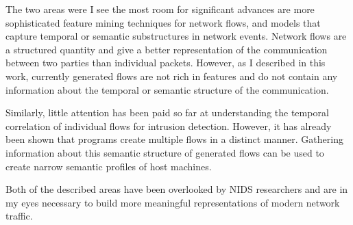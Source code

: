 \documentclass[a4paper,12pt,twoside]{report}
\begin{document}
The two areas were I see the most room for significant advances are more sophisticated feature mining techniques for network flows, and models that capture temporal or semantic substructures in network events. Network flows are a structured quantity and give a better representation of the communication between two parties than individual packets. However, as I described in this work, currently generated flows are not rich in features and do not contain any information about the temporal or semantic structure of the communication. 

Similarly, little attention has been paid so far at understanding the temporal correlation of individual flows for intrusion detection. However, it has already been shown \cite{yen2009browser} that programs create multiple flows in a distinct manner. Gathering information about this semantic structure of generated flows can be used to create narrow semantic profiles of host machines.

Both of the described areas have been overlooked by NIDS researchers and are in my eyes necessary to build more meaningful representations of modern network traffic.













\appendix



\end{document}
